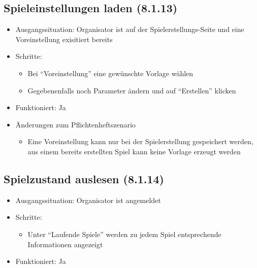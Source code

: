 \documentclass[a4paper]{scrreprt}
\begin{document}
            \subsection{Spieleinstellungen laden (8.1.13)}
            \begin{itemize}
                \item Ausgangssituation: Organisator ist auf der Spielerstellungs-Seite und eine Voreinstellung exisitiert bereits
                \item Schritte:
                    \begin{itemize}
                        \item Bei \enquote{Voreinstellung} eine gewünschte Vorlage wählen
                        \item Gegebenenfalls noch Parameter ändern und auf \enquote{Erstellen} klicken
                    \end{itemize}
                \item Funktioniert: Ja
                \item Änderungen zum Pflichtenheftszenario
                \begin{itemize}
                    \item Eine Voreinstellung kann nur bei der Spielerstellung gespeichert werden, aus einem bereits erstellten Spiel kann keine Vorlage erzeugt werden
                \end{itemize}
            \end{itemize}

            \subsection{Spielzustand auslesen (8.1.14)}
            \begin{itemize}
                \item Ausgangssituation: Organisator ist angemeldet
                \item Schritte:
                    \begin{itemize}
                        \item Unter \enquote{Laufende Spiele} werden zu jedem Spiel entsprechende Informationen angezeigt
                    \end{itemize}
                \item Funktioniert: Ja
            \end{itemize}
\end{document}
